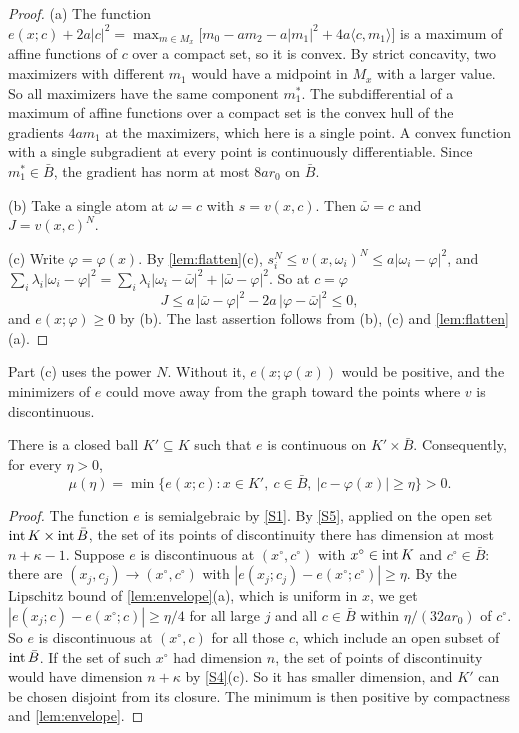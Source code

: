 \begin{proof}
(a) The function $e(x;c)+2a|c|^2=\max_{m\in M_x}\bigl[m_0-am_2-a|m_1|^2+4a\langle c,m_1\rangle\bigr]$ is a maximum of affine functions of $c$ over a compact set, so it is convex. By strict concavity, two maximizers with different $m_1$ would have a midpoint in $M_x$ with a larger value. So all maximizers have the same component $m_1^*$. The subdifferential of a maximum of affine functions over a compact set is the convex hull of the gradients $4am_1$ at the maximizers, which here is a single point. A convex function with a single subgradient at every point is continuously differentiable. Since $m_1^*\in\bar B$, the gradient has norm at most $8ar_0$ on $\bar B$.

(b) Take a single atom at $\omega=c$ with $s=v(x,c)$. Then $\bar\omega=c$ and $J=v(x,c)^N$.

(c) Write $\varphi=\varphi(x)$. By \cref{lem:flatten}(c), $s_i^N\le v(x,\omega_i)^N\le a|\omega_i-\varphi|^2$, and $\sum_i\lambda_i|\omega_i-\varphi|^2=\sum_i\lambda_i|\omega_i-\bar\omega|^2+|\bar\omega-\varphi|^2$. So at $c=\varphi$
\[
J\le a\,|\bar\omega-\varphi|^2-2a\,|\varphi-\bar\omega|^2\le0 ,
\]
and $e(x;\varphi)\ge0$ by (b). The last assertion follows from (b), (c) and \cref{lem:flatten}(a).
\end{proof}

Part (c) uses the power $N$. Without it, $e(x;\varphi(x))$ would be positive, and the minimizers of $e$ could move away from the graph toward the points where $v$ is discontinuous.

\begin{lemma}\label{lem:continuity}
There is a closed ball $K'\subseteq K$ such that $e$ is continuous on $K'\times\bar B$. Consequently, for every $\eta>0$,
\[
\mu(\eta)=\min\{e(x;c):x\in K',\ c\in\bar B,\ |c-\varphi(x)|\ge\eta\}>0 .
\]
\end{lemma}

\begin{proof}
The function $e$ is semialgebraic by \ref{S1}. By \ref{S5}, applied on the open set $\operatorname{int} K\times\operatorname{int}\bar B$, the set of its points of discontinuity there has dimension at most $n+\kappa-1$. Suppose $e$ is discontinuous at $(x^\circ,c^\circ)$ with $x^\circ\in\operatorname{int} K$ and $c^\circ\in\bar B$: there are $(x_j,c_j)\to(x^\circ,c^\circ)$ with $|e(x_j;c_j)-e(x^\circ;c^\circ)|\ge\eta$. By the Lipschitz bound of \cref{lem:envelope}(a), which is uniform in $x$, we get $|e(x_j;c)-e(x^\circ;c)|\ge\eta/4$ for all large $j$ and all $c\in\bar B$ within $\eta/(32ar_0)$ of $c^\circ$. So $e$ is discontinuous at $(x^\circ,c)$ for all those $c$, which include an open subset of $\operatorname{int}\bar B$. If the set of such $x^\circ$ had dimension $n$, the set of points of discontinuity would have dimension $n+\kappa$ by \ref{S4}(c). So it has smaller dimension, and $K'$ can be chosen disjoint from its closure. The minimum is then positive by compactness and \cref{lem:envelope}.
\end{proof}

